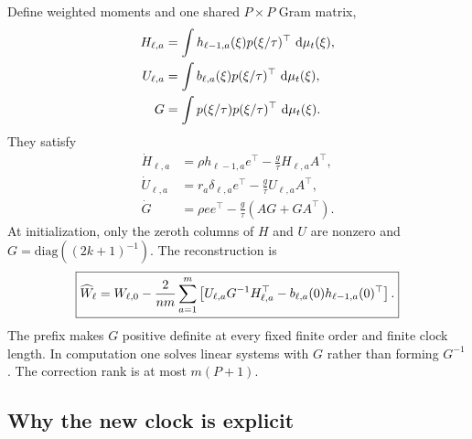 Define weighted moments and one shared $P\times P$ Gram matrix,
\begin{align}
H_{\ell,a}&=\int h_{\ell-1,a}(\xi)p(\xi/\tau)^\top\,\mathop{}\!\mathrm d\mu_t(\xi),\nonumber\\
U_{\ell,a}&=\int b_{\ell,a}(\xi)p(\xi/\tau)^\top\,\mathop{}\!\mathrm d\mu_t(\xi),\nonumber\\
G&=\int p(\xi/\tau)p(\xi/\tau)^\top\,\mathop{}\!\mathrm d\mu_t(\xi).
\label{eq:weighted-moments}
\end{align}
They satisfy
\begin{align}
\dot H_{\ell,a}&=\rho h_{\ell-1,a}e^\top
                   -\frac g\tau H_{\ell,a}A^\top,\nonumber\\
\dot U_{\ell,a}&=r_a\delta_{\ell,a}e^\top
                   -\frac g\tau U_{\ell,a}A^\top,\nonumber\\
\dot G&=\rho ee^\top-\frac g\tau(AG+GA^\top).
\label{eq:weighted-ode}
\end{align}
At initialization, only the zeroth columns of $H$ and $U$ are nonzero and
$G=\mathrm{diag}((2k+1)^{-1})$.  The reconstruction is
\begin{equation}
 \boxed{
 \widehat W_\ell=W_{\ell,0}-\frac{2}{nm}\sum_{a=1}^m
 \left[U_{\ell,a}G^{-1}H_{\ell,a}^\top
       -b_{\ell,a}(0)h_{\ell-1,a}(0)^\top\right].}
 \label{eq:weighted-reconstruction}
\end{equation}
The prefix makes $G$ positive definite at every fixed finite order and finite
clock length.  In computation one solves linear systems with $G$ rather than
forming $G^{-1}$.  The correction rank is at most $m(P+1)$.

\subsection{Why the new clock is explicit}
\label{sec:explicit-clock}

